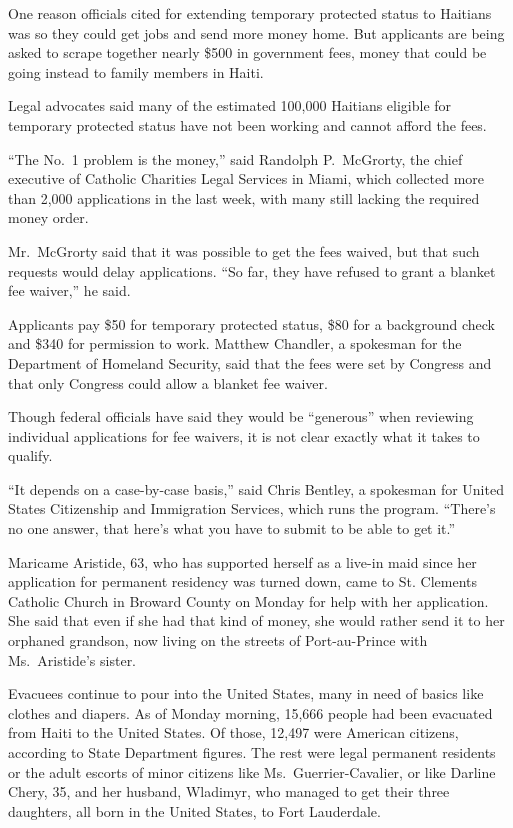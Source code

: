 ﻿\documentclass[12pt]{article}
\begin{document}
One reason officials cited for extending temporary protected status to Haitians was so they could
get jobs and send more money home. But applicants are being asked to scrape together nearly \$500 in
government fees, money that could be going instead to family members in Haiti.

Legal advocates said many of the estimated 100,000 Haitians eligible for temporary protected status
have not been working and cannot afford the fees.

``The No.~1 problem is the money,'' said Randolph P.~McGrorty, the chief executive of Catholic
Charities Legal Services in Miami, which collected more than 2,000 applications in the last week,
with many still lacking the required money order.

Mr.~McGrorty said that it was possible to get the fees waived, but that such requests would delay
applications. ``So far, they have refused to grant a blanket fee waiver,'' he said.

Applicants pay \$50 for temporary protected status, \$80 for a background check and \$340 for
permission to work. Matthew Chandler, a spokesman for the Department of Homeland Security, said that
the fees were set by Congress and that only Congress could allow a blanket fee waiver.

Though federal officials have said they would be ``generous'' when reviewing individual applications
for fee waivers, it is not clear exactly what it takes to qualify.

``It depends on a case-by-case basis,'' said Chris Bentley, a spokesman for United States
Citizenship and Immigration Services, which runs the program. ``There's no one answer, that here's
what you have to submit to be able to get it.''

Maricame Aristide, 63, who has supported herself as a live-in maid since her application for
permanent residency was turned down, came to St. Clements Catholic Church in Broward County on
Monday for help with her application. She said that even if she had that kind of money, she would
rather send it to her orphaned grandson, now living on the streets of Port-au-Prince with
Ms.~Aristide's sister.

Evacuees continue to pour into the United States, many in need of basics like clothes and diapers.
As of Monday morning, 15,666 people had been evacuated from Haiti to the United States. Of those,
12,497 were American citizens, according to State Department figures. The rest were legal permanent
residents or the adult escorts of minor citizens like Ms.~Guerrier-Cavalier, or like Darline Chery,
35, and her husband, Wladimyr, who managed to get their three daughters, all born in the United
States, to Fort Lauderdale.
\end{document}
